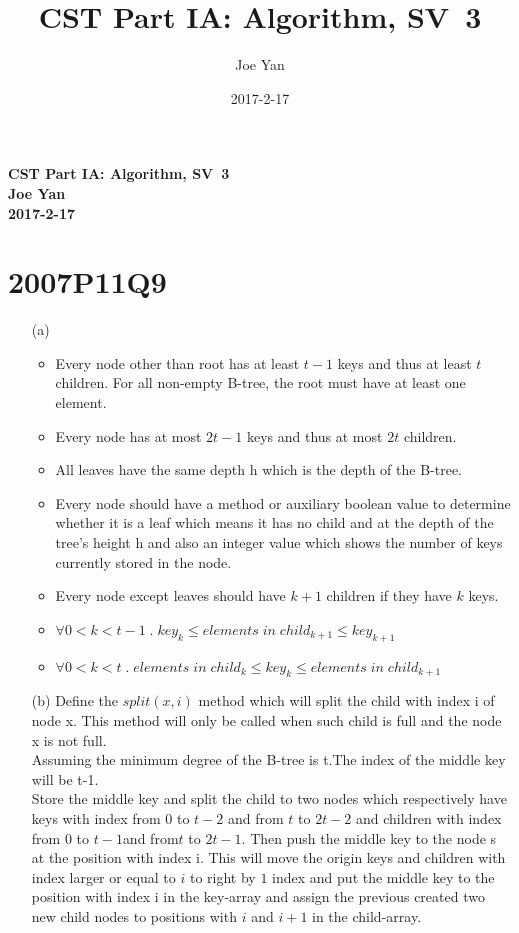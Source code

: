 \documentclass[10pt,twoside,a4paper]{article}
\newcommand{\studentname}{Joe Yan}
\newcommand{\svworkdate}{2017-2-17}
\newcommand{\svcourse}{CST Part IA: Algorithm}
\newcommand{\svnumber}{3}
\begin{document}
\author{\studentname}
\title{\svcourse, SV~\svnumber}
\date{\svworkdate}

\textbf{\svcourse, SV~\svnumber}\\
\textbf{\studentname}\\
\textbf{\svworkdate}\\

\section{2007P11Q9}
\begin{itemize}
\item[(a)]
\begin{itemize}
\item Every node other than root has at least $t-1$ keys and thus at least $t$ children. For all non-empty B-tree, the root must have at least one element.
\item Every node has at most $2t-1$ keys and thus at most $2t$ children.
\item All leaves have the same depth h which is the depth of the B-tree.
\item Every node should have a method or auxiliary boolean value to determine whether it is a leaf which means it has no child and at the depth of the tree's height h and also an integer value which shows the number of keys currently stored in the node.
\item Every node except leaves should have $k+1$ children if they have $k$ keys.
\item $\forall 0<k<t-1 \; . \; key_k \leq elements \;   in \;  child_{k+1} \leq key_{k+1}$
\item $\forall 0<k<t \; . \; elements \;   in \;  child_{k} \leq key_k \leq elements \;   in \;  child_{k+1}$
\end{itemize}
\item[(b)]
Define the $split(x,i)$ method which will split the child with index i of node x. This method will only be called when such child is full and the node x is not full. 
\\Assuming the minimum degree of the B-tree is t.The index of the middle key will be t-1.
\\Store the middle key and split the child to two nodes which respectively have keys with index from $0$ to $t-2$ and from $t$ to $2t-2$ and children with index from $0$ to $t-1$and from$t$ to $2t-1$. Then push the middle key to the node s at the position with index i. This will move the origin keys and children with index larger or equal to $i$ to right by $1$ index and put the middle key to the position with index i in the key-array and assign the previous created two new child nodes to positions with $i$ and $i+1$ in the child-array.

\end{itemize}
\end{document}

